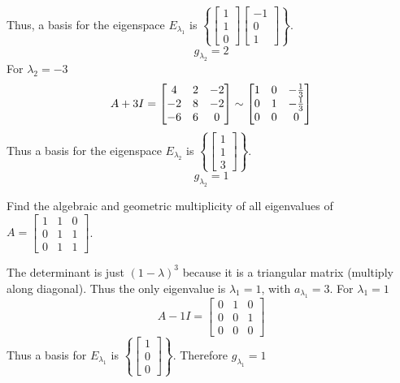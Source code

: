 \documentclass[english, 12pt]{article}
\begin{document}
\begin{exmp}
\begin{sol}
Thus, a basis for the eigenspace $E_{\lambda_1}$ is $\left\{\begin{bmatrix} 1 \\ 1 \\ 0 \end{bmatrix} \begin{bmatrix} -1 \\ 0 \\ 1 \end{bmatrix} \right\}$.
\[g_{\lambda_2} = 2\]
For $\lambda_2 = -3$
\[A + 3I = \begin{bmatrix} 4 & 2 & -2 \\ -2 & 8 & -2 \\ -6 & 6 & 0 \end{bmatrix} \sim \begin{bmatrix} 1 & 0 & -\frac{1}{3} \\ 0 & 1 & - \frac{1}{3} \\ 0 & 0 & 0 \end{bmatrix}\]
Thus a basis for the eigenspace $E_{\lambda_2}$ is $\left\{\begin{bmatrix} 1 \\ 1 \\ 3 \end{bmatrix} \right\}$.
\[g_{\lambda_2} = 1\]
\end{sol}
\end{exmp}

\begin{exmp}
Find the algebraic and geometric multiplicity of all eigenvalues of $A = \begin{bmatrix} 1 & 1 & 0 \\ 0 & 1 & 1 \\ 0 & 1 & 1 \end{bmatrix}$.

\begin{sol}
The determinant is just $(1-\lambda)^3$ because it is a triangular matrix (multiply along diagonal).
Thus the only eigenvalue is $\lambda_1 = 1$, with $a_{\lambda_1} = 3$. \n
For $\lambda_1 = 1$
\[A - 1I = \begin{bmatrix} 0 & 1 & 0 \\ 0 & 0 & 1 \\ 0 & 0 & 0 \end{bmatrix}\]
Thus a basis for $E_{\lambda_1}$ is $\left\{\begin{bmatrix} 1 \\ 0 \\ 0 \end{bmatrix}\right\}$. Therefore $g_{\lambda_1} = 1$
\end{sol}
\end{exmp}
\end{document}
